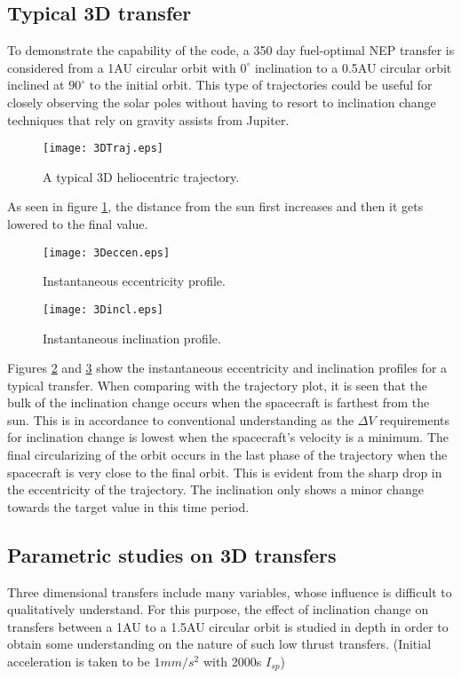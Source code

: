 \subsection{Typical 3D transfer}
To demonstrate the capability of the code, a 350 day fuel-optimal NEP transfer is considered from a 1AU circular orbit with $0^\circ$ inclination to a 0.5AU circular orbit inclined at $90^\circ$ to the initial orbit. This type of trajectories could be useful for closely observing the solar poles without having to resort to inclination change techniques that rely on gravity assists from Jupiter.
\begin{figure}[H]
	\centering\texttt{[image: 3DTraj.eps]}
	\caption{A typical 3D heliocentric trajectory.}
	\label{3d_Trajsample}
\end{figure}
As seen in figure \ref{3d_Trajsample}, the distance from the sun first increases and then it gets lowered to the final value.
\begin{figure}[H]
	\centering\texttt{[image: 3Deccen.eps]}
	\caption{Instantaneous eccentricity profile.}
	\label{3d_sampeccenc}
\end{figure}
\begin{figure}[H]
	\centering\texttt{[image: 3Dincl.eps]}
	\caption{Instantaneous inclination profile.}
	\label{3d_sampincln}
\end{figure}
Figures \ref{3d_sampeccenc} and \ref{3d_sampincln} show the instantaneous eccentricity and inclination profiles for a typical transfer. When comparing with the trajectory plot, it is seen that the bulk of the inclination change occurs when the spacecraft is farthest from the sun. This is in accordance to conventional understanding as the $\Delta V$ requirements for inclination change is lowest when the spacecraft's velocity is a minimum. The final circularizing of the orbit occurs in the last phase of the trajectory when the spacecraft is very close to the final orbit. This is evident from the sharp drop in the eccentricity of the trajectory. The inclination only shows a minor change towards the target value in this time period. 
\subsection{Parametric studies on 3D transfers}
Three dimensional transfers include many variables, whose influence is difficult to qualitatively understand. For this purpose, the effect of inclination change on transfers between a 1AU to a 1.5AU circular orbit is studied in depth in order to obtain some understanding on the nature of such low thrust transfers. (Initial acceleration is taken to be $1mm/s^2$ with 2000s $I_{sp}$)
